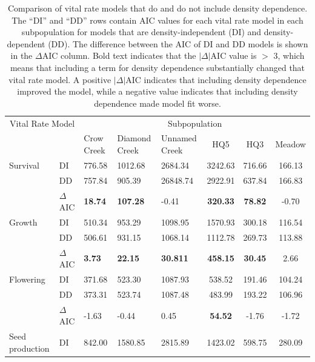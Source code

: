\documentclass[12pt, letterpaper]{article}
\begin{document}
\begin{table}[h!]
\centering
\begin{spacing}{1.2}
\caption{ \internallinenumbers Comparison of vital rate models that do and do not include density dependence. The “DI” and “DD” rows contain AIC values for each vital rate model in each subpopulation for models that are density-independent (DI) and density-dependent (DD). The difference between the AIC of DI and DD models is shown in the $\Delta$AIC column. Bold text indicates that the $|\Delta|$AIC value is $>$ 3, which means that including a term for density dependence substantially changed that vital rate model. A positive $|\Delta|$AIC indicates that including density dependence improved the model, while a negative value indicates that including density dependence made model fit worse.\label{Table:DDModResults}}
\begin{tabular}{l l p{} p{} p{}ccc}
\toprule
\multicolumn{2}{c}{Vital Rate Model} & \multicolumn{6}{c}{Subpopulation} 
\\ \cline{3-8}
& & Crow Creek & Diamond Creek & Unnamed Creek & HQ5 & HQ3 & Meadow \\ 
\hline
\rowcolor[gray]{.95} Survival & DI &     776.58 &  1012.68 & 2684.34 & 3242.63 & 716.66 & 166.13 \\
\rowcolor[gray]{.95} & DD &              757.84 &  905.39  & 26848.74 & 2922.91 & 637.84 & 166.83 \\ 
\rowcolor[gray]{.95} & $\Delta$AIC &     \textbf{18.74} &   \textbf{107.28} &  -0.41 &   \textbf{320.33} &  \textbf{78.82} &   -0.70 \\ 
Growth & DI &                            510.34 &  953.29 &  1098.95 & 1570.93 & 300.18 & 116.54 \\
& DD &                                   506.61 &  931.15 &  1068.14 & 1112.78 & 269.73 & 113.88 \\
& $\Delta$AIC &                          \textbf{3.73} &    \textbf{22.15} &   \textbf{30.811} &  \textbf{458.15} &  \textbf{30.45} &  2.66 \\
\rowcolor[gray]{.95} Flowering & DI &    371.68 &  523.30 &  1087.93 & 538.52 &  191.46 & 104.24 \\
\rowcolor[gray]{.95} & DD &              373.31 &  523.74  & 1087.48 & 483.99 &  193.22 & 106.96 \\
\rowcolor[gray]{.95} & $\Delta$AIC &     -1.63 &   -0.44 &   0.45 &    \textbf{54.52} &   -1.76 &  -1.72 \\
Seed production & DI &                   842.00 &  1580.85 & 2815.89 & 1423.02 & 598.75 & 280.09 \\

\end{tabular}
\end{spacing}
\end{table}
\end{document}
